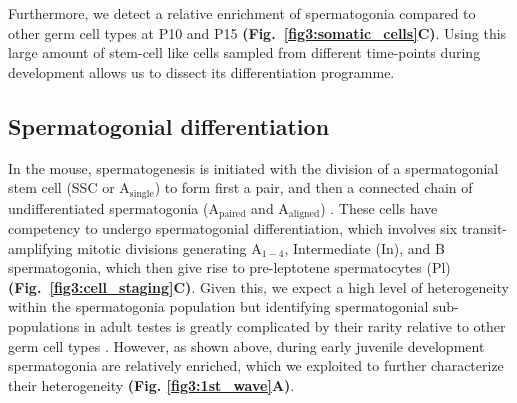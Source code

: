 Furthermore, we detect a relative enrichment of spermatogonia compared to other germ cell types at P10 and P15 \textbf{(Fig.~\ref{fig3:somatic_cells}C)}. Using this large amount of stem-cell like cells sampled from different time-points during development allows us to dissect its differentiation programme.

\newpage

\subsection{Spermatogonial differentiation}

In the mouse, spermatogenesis is initiated with the division of a spermatogonial stem cell (SSC or A$_{\text{single}}$) to form first a pair, and then a connected chain of undifferentiated spermatogonia (A$_{\text{paired}}$ and A$_{\text{aligned}}$) \citep{Oakberg1971, DeRooij1973}. These cells have competency to undergo spermatogonial differentiation, which involves six transit-amplifying mitotic divisions generating A$_{1-4}$, Intermediate (In), and B spermatogonia, which then give rise to pre-leptotene spermatocytes (Pl) \citep{DeRooij2000} \textbf{(Fig.~\ref{fig3:cell_staging}C)}. Given this, we expect a high level of heterogeneity within the spermatogonia population but identifying spermatogonial sub-populations in adult testes is greatly complicated by their rarity relative to other germ cell types \citep{Lukassen2018}. However, as shown above, during early juvenile development spermatogonia are relatively enriched, which we exploited to further characterize their heterogeneity \textbf{(Fig. \ref{fig3:1st_wave}A)}. \\

